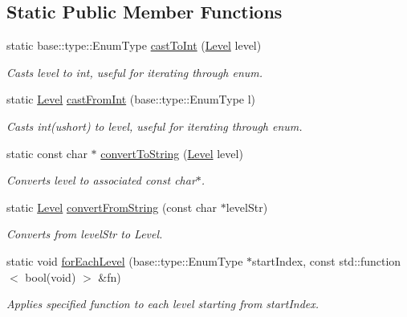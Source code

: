 \subsection*{Static Public Member Functions}
\begin{DoxyCompactItemize}
\item 
\hypertarget{classel_1_1LevelHelper_a6576fd7cd6d1d839952145115c6e4b38}{static base\-::type\-::\-Enum\-Type \hyperlink{classel_1_1LevelHelper_a6576fd7cd6d1d839952145115c6e4b38}{cast\-To\-Int} (\hyperlink{namespaceel_ab0ac6091262344c52dd2d3ad099e8e36}{Level} level)}\label{classel_1_1LevelHelper_a6576fd7cd6d1d839952145115c6e4b38}

\begin{DoxyCompactList}\small\item\em Casts level to int, useful for iterating through enum. \end{DoxyCompactList}\item 
\hypertarget{classel_1_1LevelHelper_a1279f27df29a003df5ecc3d0bf4dacbb}{static \hyperlink{namespaceel_ab0ac6091262344c52dd2d3ad099e8e36}{Level} \hyperlink{classel_1_1LevelHelper_a1279f27df29a003df5ecc3d0bf4dacbb}{cast\-From\-Int} (base\-::type\-::\-Enum\-Type l)}\label{classel_1_1LevelHelper_a1279f27df29a003df5ecc3d0bf4dacbb}

\begin{DoxyCompactList}\small\item\em Casts int(ushort) to level, useful for iterating through enum. \end{DoxyCompactList}\item 
static const char $\ast$ \hyperlink{classel_1_1LevelHelper_a53b3e226a09af6e87c2072c115b3ba1a}{convert\-To\-String} (\hyperlink{namespaceel_ab0ac6091262344c52dd2d3ad099e8e36}{Level} level)
\begin{DoxyCompactList}\small\item\em Converts level to associated const char$\ast$. \end{DoxyCompactList}\item 
static \hyperlink{namespaceel_ab0ac6091262344c52dd2d3ad099e8e36}{Level} \hyperlink{classel_1_1LevelHelper_a4ff401c62931609c849d580fb6ad2028}{convert\-From\-String} (const char $\ast$level\-Str)
\begin{DoxyCompactList}\small\item\em Converts from level\-Str to Level. \end{DoxyCompactList}\item 
static void \hyperlink{classel_1_1LevelHelper_a953aafa4c876bd673e1e89b0fa57077e}{for\-Each\-Level} (base\-::type\-::\-Enum\-Type $\ast$start\-Index, const std\-::function$<$ bool(void) $>$ \&fn)
\begin{DoxyCompactList}\small\item\em Applies specified function to each level starting from start\-Index. \end{DoxyCompactList}\end{DoxyCompactItemize}
